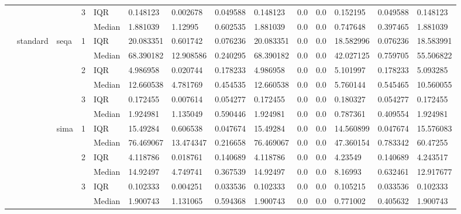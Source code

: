\begin{tabular}{llllllllllllll}
    &       &      & 3 & IQR &   0.148123 &   0.002678 &  0.049588 &   0.148123 &       0.0 &       0.0 &   0.152195 &  0.049588 &   0.148123 \\
    &       &      &   & Median &   1.881039 &    1.12995 &  0.602535 &   1.881039 &       0.0 &       0.0 &   0.747648 &  0.397465 &   1.881039 \\
    & standard & seqa & 1 & IQR &  20.083351 &   0.601742 &  0.076236 &  20.083351 &       0.0 &       0.0 &  18.582996 &  0.076236 &  18.583991 \\
    &       &      &   & Median &  68.390182 &  12.908586 &  0.240295 &  68.390182 &       0.0 &       0.0 &  42.027125 &  0.759705 &  55.506822 \\
    &       &      & 2 & IQR &   4.986958 &   0.020744 &  0.178233 &   4.986958 &       0.0 &       0.0 &   5.101997 &  0.178233 &   5.093285 \\
    &       &      &   & Median &  12.660538 &   4.781769 &  0.454535 &  12.660538 &       0.0 &       0.0 &   5.760144 &  0.545465 &  10.560055 \\
    &       &      & 3 & IQR &   0.172455 &   0.007614 &  0.054277 &   0.172455 &       0.0 &       0.0 &   0.180327 &  0.054277 &   0.172455 \\
    &       &      &   & Median &   1.924981 &   1.135049 &  0.590446 &   1.924981 &       0.0 &       0.0 &   0.787361 &  0.409554 &   1.924981 \\
    &       & sima & 1 & IQR &   15.49284 &   0.606538 &  0.047674 &   15.49284 &       0.0 &       0.0 &  14.560899 &  0.047674 &  15.576083 \\
    &       &      &   & Median &  76.469067 &  13.474347 &  0.216658 &  76.469067 &       0.0 &       0.0 &  47.360154 &  0.783342 &   60.47255 \\
    &       &      & 2 & IQR &   4.118786 &   0.018761 &  0.140689 &   4.118786 &       0.0 &       0.0 &    4.23549 &  0.140689 &   4.243517 \\
    &       &      &   & Median &   14.92497 &   4.749741 &  0.367539 &   14.92497 &       0.0 &       0.0 &    8.16993 &  0.632461 &  12.917677 \\
    &       &      & 3 & IQR &   0.102333 &   0.004251 &  0.033536 &   0.102333 &       0.0 &       0.0 &   0.105215 &  0.033536 &   0.102333 \\
    &       &      &   & Median &   1.900743 &   1.131065 &  0.594368 &   1.900743 &       0.0 &       0.0 &   0.771002 &  0.405632 &   1.900743 \\

\end{tabular}

